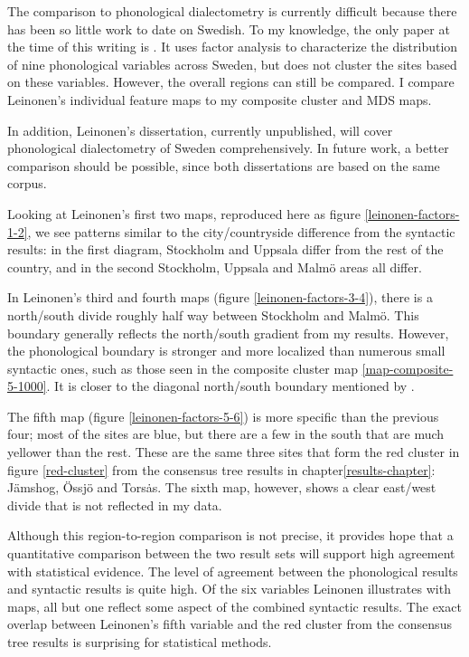 The comparison to phonological dialectometry is currently difficult
because there has been so little work to date on Swedish. To my
knowledge, the only paper at the time of this writing is
. It uses factor analysis to characterize the
distribution of nine phonological variables across Sweden, but does
not cluster the sites based on these variables. However, the overall
regions can still be compared. I compare Leinonen's
individual feature maps to my composite cluster and MDS maps.

In addition, Leinonen's dissertation, currently unpublished, will
cover phonological dialectometry of Sweden comprehensively. In future
work, a better comparison should be possible, since both dissertations
are based on the same corpus.

Looking at Leinonen's first two maps, reproduced here as figure
\ref{leinonen-factors-1-2}, we see patterns similar to the
city/countryside difference from the syntactic results: in the first diagram,
Stockholm and Uppsala differ from the rest of the country, and in the
second Stockholm, Uppsala and Malm\"o areas all differ.

In Leinonen's third and fourth maps (figure \ref{leinonen-factors-3-4}),
there is a north/south divide roughly half way between Stockholm and
Malm\"o. This boundary generally reflects the north/south
gradient from my results. However, the phonological boundary is stronger and more
localized than numerous small syntactic ones, such as those seen in
the composite cluster map \ref{map-composite-5-1000}. It is closer to
the diagonal north/south boundary mentioned by .

The fifth map (figure \ref{leinonen-factors-5-6}) is more specific
than the previous four; most of the sites are blue, but there are a
few in the south that are much yellower than the rest. These are the
same three sites that form the red cluster in figure \ref{red-cluster}
from the consensus tree results in chapter\ref{results-chapter}:
J\"amshog, \"Ossj\"o and Tors\.as. The sixth map, however, shows a
clear east/west divide that is not reflected in my data.

Although this region-to-region comparison is not precise, it provides
hope that a quantitative comparison between the two result sets will
support high agreement with statistical evidence. The level of
agreement between the phonological results and syntactic results is
quite high. Of the six variables Leinonen illustrates with maps, all
but one reflect some aspect of the combined syntactic results. The
exact overlap between Leinonen's fifth variable and the red cluster
from the consensus tree results is surprising for statistical methods.

